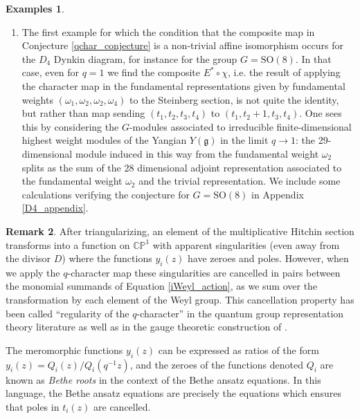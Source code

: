 \documentclass[11pt, oneside, reqno]{amsart}
\theoremstyle{definition} \newtheorem{definition}{Definition}[section]
\theoremstyle{definition} \newtheorem{remark}[definition]{Remark}
\theoremstyle{definition} \newtheorem{remarks}[definition]{Remarks}
\theoremstyle{definition} \newtheorem{question}[definition]{Question}
\theoremstyle{definition} \newtheorem*{note}{Note}
\theoremstyle{definition} \newtheorem{example}[definition]{Example}
\theoremstyle{definition} \newtheorem{examples}[definition]{Examples}
\renewcommand{\gg}{\mathfrak{g}}
\newcommand{\bb}[1]{\mathbb{#1}}
\newcommand{\SO}{\mathrm{SO}}
\begin{document}
\begin{examples}
\begin{enumerate}
\item The first example for which the condition that the composite map in Conjecture \ref{qchar_conjecture} is a non-trivial affine isomorphism occurs for the $D_4$ Dynkin diagram, for instance for the group $G = \SO(8)$.  In that case, even for $q=1$ we find the composite $E^* \circ \chi$, i.e. the result of applying the character map in the fundamental representations given by fundamental weights $(\omega_1, \omega_2,\omega_2,\omega_4)$ to the Steinberg section, is not quite the identity, but rather than map sending $(t_1,t_2,t_3,t_4)$ to $(t_1,t_2+1,t_3,t_4)$.  One sees this by considering the $G$-modules associated to irreducible finite-dimensional highest weight modules of the Yangian $Y(\gg)$ in the limit $q \to 1$: the 29-dimensional module induced in this way from the fundamental weight $\omega_2$ splits as the sum of the 28 dimensional adjoint representation associated to the fundamental weight $\omega_2$ and the trivial representation.  We include some calculations verifying the conjecture for $G=\SO(8)$ in Appendix \ref{D4_appendix}.
\end{enumerate}
\end{examples}

\begin{remark}
After triangularizing, an element of the multiplicative Hitchin section transforms into a function on $\bb{CP}^1$ with apparent singularities (even away from the divisor $D$) where the functions $y_{i}(z)$ have zeroes and poles.  However, when we apply the $q$-character map these singularities are cancelled in pairs between the monomial summands of Equation \ref{iWeyl_action}, as we sum over the transformation by each element of the Weyl group.  This cancellation property has been called ``regularity of the $q$-character'' in the quantum group representation theory literature \cite{FrenkelReshetikhin1,FrenkelReshetikhin2} as well as in the gauge theoretic construction of \cite{NekrasovPestunShatashvili,Nekrasov:2015wsu,NekrasovPestun,Kimura:2015rgi}.
 
The meromorphic functions $y_{i}(z)$ can be expressed as ratios of the form $y_{i}(z) = Q_{i}(z)/Q_i(q^{-1}z)$, and the zeroes of the functions denoted $Q_i$ are known as \emph{Bethe roots} in the context of the Bethe ansatz equations.  In this language, the Bethe ansatz equations are precisely the equations which ensures that poles in $t_{i}(z)$ are cancelled. 
\end{remark}
\end{document}
